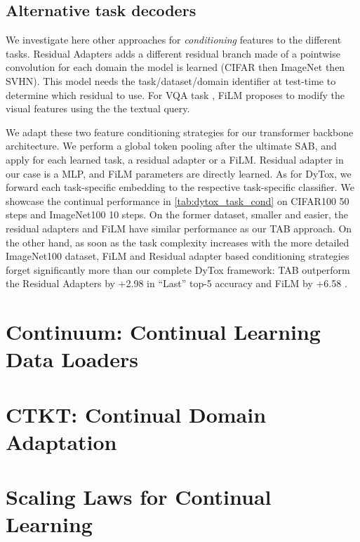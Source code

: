 

\subsection{Alternative task decoders}

We investigate here other approaches for \textit{conditioning} features to the different tasks.
Residual Adapters \cite{rebuffi2017residualadapters} adds a different residual branch made of a
pointwise convolution for each domain the model is learned (\eg CIFAR then ImageNet then SVHN). This
model needs the task/dataset/domain identifier at test-time to determine which residual to use. For
VQA task \cite{antol2015vqa}, FiLM \cite{perez2018film} proposes to modify the visual features using
the the textual query.

We adapt these two feature conditioning strategies for our transformer backbone architecture. We
perform a global token pooling after the ultimate SAB, and apply for each learned task, a residual
adapter or a FiLM. Residual adapter in our case is a MLP, and FiLM parameters are directly learned.
As for DyTox, we forward each task-specific embedding to the respective task-specific classifier. We
showcase the continual performance in \autoref{tab:dytox_task_cond} on CIFAR100 50 steps and ImageNet100
10 steps. On the former dataset, smaller and easier,  the residual adapters and FiLM have similar
performance as our TAB approach. On the other hand, as soon as the task complexity increases with
the more detailed ImageNet100 dataset, FiLM and Residual adapter based conditioning strategies
forget significantly more than our complete DyTox framework: TAB outperform the Residual Adapters by
+2.98 \pp in ``Last'' top-5 accuracy and FiLM by +6.58 \pp.





\section{Continuum: Continual Learning Data Loaders}

\section{CTKT: Continual Domain Adaptation}

\section{Scaling Laws for Continual Learning}


